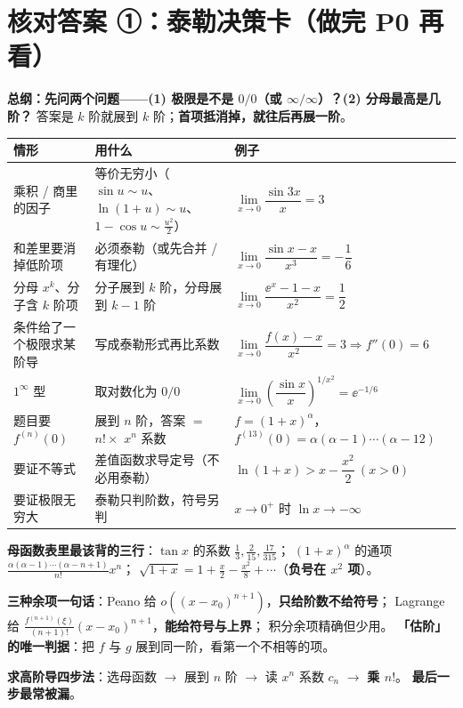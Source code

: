 \section{核对答案 ①：泰勒决策卡（做完 P0 再看）}
\textbf{总纲：先问两个问题——(1) 极限是不是 $0/0$（或 $\infty/\infty$）？(2) 分母最高是几阶？}
答案是 $k$ 阶就展到 $k$ 阶；\textbf{首项抵消掉，就往后再展一阶}。
\small
\setlength{\tabcolsep}{4pt}
\begin{tabularx}{\linewidth}{p{3.8cm}|p{4.6cm}|X}
\toprule
情形 & 用什么 & 例子 \\
\midrule
乘积 / 商里的因子 & 等价无穷小（$\sin u\sim u$、$\ln(1+u)\sim u$、$1-\cos u\sim\frac{u^{2}}2$） &
$\lim\limits_{x\to0}\dfrac{\sin 3x}{x}=3$\\
和差里要消掉低阶项 & 必须泰勒（或先合并 / 有理化） &
$\lim\limits_{x\to0}\dfrac{\sin x-x}{x^{3}}=-\dfrac16$\\
分母 $x^{k}$、分子含 $k$ 阶项 & 分子展到 $k$ 阶，分母展到 $k-1$ 阶 &
$\lim\limits_{x\to0}\dfrac{\ee^{x}-1-x}{x^{2}}=\dfrac12$\\
条件给了一个极限求某阶导 & 写成泰勒形式再比系数 &
$\lim\limits_{x\to0}\dfrac{f(x)-x}{x^{2}}=3\Rightarrow f''(0)=6$\\
$1^\infty$ 型 & 取对数化为 $0/0$ &
$\lim\limits_{x\to0}\left(\dfrac{\sin x}{x}\right)^{1/x^{2}}=\ee^{-1/6}$\\
题目要 $f^{(n)}(0)$ & 展到 $n$ 阶，答案 $=$ $n!\times$ $x^{n}$ 系数 &
$f=(1+x)^{\alpha}$，$f^{(13)}(0)=\alpha(\alpha-1)\cdots(\alpha-12)$\\
要证不等式 & 差值函数求导定号（不必用泰勒） &
$\ln(1+x)>x-\dfrac{x^{2}}2\ (x>0)$\\
要证极限无穷大 & 泰勒只判阶数，符号另判 &
$x\to0^{+}$ 时 $\ln x\to-\infty$\\
\bottomrule
\end{tabularx}
\normalsize\smallskip
\textbf{母函数表里最该背的三行}：$\tan x$ 的系数 $\frac13,\frac{2}{15},\frac{17}{315}$；
$(1+x)^{\alpha}$ 的通项 $\frac{\alpha(\alpha-1)\cdots(\alpha-n+1)}{n!}x^{n}$；
$\sqrt{1+x}=1+\frac{x}{2}-\frac{x^{2}}8+\cdots$（\textbf{负号在 $x^{2}$ 项}）。
\vspace{0.2em}

\textbf{三种余项一句话}：Peano 给 $o((x-x_0)^{n+1})$，\textbf{只给阶数不给符号}；
Lagrange 给 $\frac{f^{(n+1)}(\xi)}{(n+1)!}(x-x_0)^{n+1}$，\textbf{能给符号与上界}；
积分余项精确但少用。
\textbf{「估阶」的唯一判据}：把 $f$ 与 $g$ 展到同一阶，看第一个不相等的项。
\vspace{0.2em}

\textbf{求高阶导四步法}：选母函数 $\to$ 展到 $n$ 阶 $\to$ 读 $x^{n}$ 系数 $c_n$ $\to$ \textbf{乘 $n!$}。
\textbf{最后一步最常被漏}。

